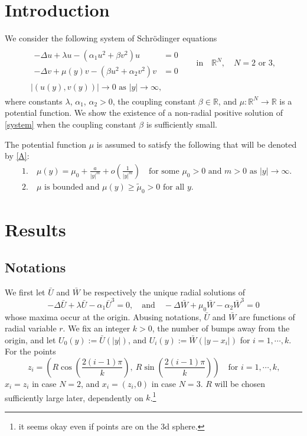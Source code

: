 \documentclass[a4paper,11pt]{article}
\def\blue{\color{blue}}
\def\blue{\color{blue}}
\numberwithin{step}{dummy}
\begin{document}
\section{Introduction} \label{sec:intro}

\newpage

We consider the following system of Schr\"odinger equations 
\begin{align}\label{system}
 \begin{aligned}
 \begin{aligned}
 -\Delta u + \lambda u - \left(\alpha_1 u^2 + \beta v^2\right) u&= 0 \\
 -\Delta v + \mu(y) v - \left(\beta u^2 + \alpha_2 v^2\right) v&= 0
 \end{aligned} \quad &\text{in} \quad \mathbb{R}^N, \quad \text{$N=2$ or $3$},\\
 \text{$\big|(u(y),v(y))\big| \rightarrow 0$ as $|y| \rightarrow \infty$},&
 \end{aligned}
\end{align}
where constants $\lambda$, $\alpha_1$, $\alpha_2>0$, the coupling constant $\beta \in \mathbb{R}$, and $\mu: \mathbb{R}^N \rightarrow \mathbb{R}$ is a potential function. We show the existence of a non-radial {\blue positive} solution of \eqref{system} when the coupling constant $\beta$ is sufficiently small.

The potential function $\mu$ is assumed to satisfy the following that will be denoted by \eqref{A}:
\begin{equation}\tag{$A$}\label{A}
 \begin{aligned}
  &1. \quad \mu(y) = \mu_0 + \frac{a}{|y|^m} + o\left(\frac{1}{|y|^m}\right) \quad \text{for some $\mu_0>0$ and $m>0$ as $|y| \rightarrow \infty$.}\\
  &2. \quad \text{$\mu$ is bounded and $\mu(y)\ge \tilde{\mu}_0 > 0$ for all $y$.}
 \end{aligned}
\end{equation}
\section{Results}
\subsection{Notations}
We first let $\bar{U}$ and $\bar{W}$ be respectively the unique radial solutions of
\begin{equation*}
 -\Delta \bar{U} + \lambda \bar{U} - \alpha_1 \bar{U}^3 = 0, \quad \text{and} \quad -\Delta \bar{W} + \mu_0 \bar{W} - \alpha_2 \bar{W}^3 = 0
\end{equation*}
whose maxima occur at the origin. Abusing notations, $\bar{U}$ and $\bar{W}$ are functions of radial variable $r$. We fix an integer $k>0$, the number of bumps away from the origin, and let $U_0(y):=\bar{U}(|y|)$, and $U_i(y):=\bar{W}(|y-x_i|)$ for $i=1,\cdots,k$. For the points 
$$z_i= \left( R \cos\left(\frac{2(i-1)\pi}{k}\right), ~R \sin\left(\frac{2(i-1)\pi}{k}\right)\right) \quad \text{for $i=1,\cdots,k$,}$$
$x_i = z_i$ in case $N=2$, and $x_i = (z_i,0)$ in case $N=3$. $R$ will be chosen sufficiently large later, dependently on $k$.\footnote{{\blue it seems okay even if points are on the 3d sphere.}}
\end{document}
